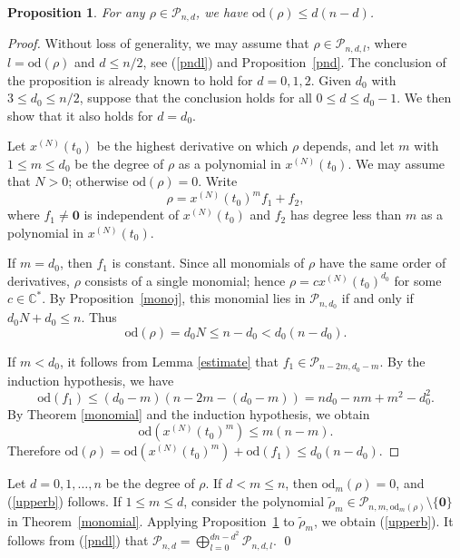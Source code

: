 \documentclass[11pt]{amsart}
\numberwithin{equation}{section}
\newcommand{\di}{\displaystyle}
\newtheorem{prop}[thm]{Proposition}
\newcommand{\bc}{\mathbb{C}}
\newcommand{\sd}{\mathrm{od}}
\newcommand{\scp}{\mathscr{P}}
\newcommand{\pnd}{\mathscr{P}_{n, d}}
\newcommand{\pndl}{\mathscr{P}_{n, d, l}}
\newcommand{\zero}{\mathbf{0}}
\begin{document}
\begin{prop} \label{homo}
  For any $\rho\in\pnd$, we have $\di\sd(\rho)\le d(n-d)$.
\end{prop}
\begin{proof}
  Without loss of generality, we may assume that $\rho\in\pndl$, where $l=\sd(\rho)$ and $d\le n/2$, see (\ref{pndl}) and Proposition~\ref{pnd}. The conclusion of the proposition is already known to hold for $d=0,1,2$. Given $d_0$ with $3\le d_0\le n/2$, suppose that the conclusion holds for all $0\le d\le d_0-1$. We then show that it also holds for $d=d_0$.

  Let $\di x^{(N)}(t_0)$ be the highest derivative on which $\rho$ depends, and let $m$ with $1\le m\le d_0$ be the degree of $\rho$ as a polynomial in $\di x^{(N)}(t_0)$. We may assume that $N>0$; otherwise $\sd(\rho)=0$. Write
\[
    \rho=x^{(N)}(t_0)^m f_1+f_2,
\]
where $f_1 \not= \zero$ is independent of $\di x^{(N)}(t_0)$ and $f_2$ has degree less than $m$ as a polynomial in $\di x^{(N)}(t_0)$.

If $m=d_0$, then $f_1$ is constant. Since all monomials of $\rho$ have the same order of derivatives,
$\rho$ consists of a single monomial; hence $\rho=c x^{(N)}(t_0)^{d_0}$ for some $c \in \bc^{\ast}$. By Proposition~\ref{monoj}, this monomial lies in $\scp_{n,d_0}$ if and only if $\di d_0N+d_0\le n$.
    Thus $$\di \sd(\rho)=d_0 N \le n-d_0 < d_0(n-d_0).$$

    If $m<d_0$, it follows from Lemma \ref{estimate} that $\di f_1 \in \scp_{n-2m, d_0-m}$.
    By the induction hypothesis, we have
    $$\sd(f_1) \le (d_0-m)(n-2m-(d_0-m))=nd_0-nm+m^2-d_0^2.$$
    By Theorem \ref{monomial} and the induction hypothesis, we obtain
    $$\sd( x^{(N)}(t_0)^m) \le m(n-m).$$
    Therefore
    $\sd(\rho)=\sd( x^{(N)}(t_0)^m)+\sd(f_1) \le d_0(n-d_0).$
\end{proof}

Let $d=0,1,\dots,n$ be the degree of $\rho$. If $d<m\le n$, then $\sd_m(\rho)=0$, and (\ref{upperb}) follows. If $1\le m\le d$, consider the polynomial $\tilde{\rho}_m\in\scp_{n,m,\sd_m(\rho)}\setminus\{\zero\}$ in Theorem~\ref{monomial}. Applying Proposition~\ref{homo} to $\tilde{\rho}_m$, we obtain (\ref{upperb}). It follows from (\ref{pndl}) that
$\pnd=\bigoplus_{l=0}^{dn-d^2}\scp_{n,d,l}$.
\qed

\end{document}

